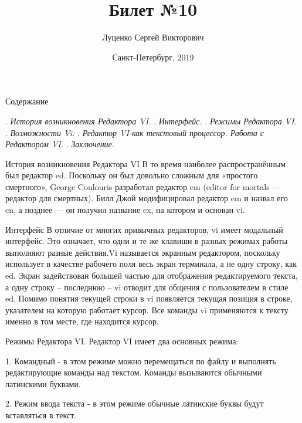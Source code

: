 \documentclass{beamer}
\begin{document}
\title{Билет №10} 
\author{Луценко Сергей Викторович}
\date{Санкт-Петербург, 2019} 
\frame{\titlepage} 
\begin{frame}{Содержание}
\begin{thebibliography}{10}
\beamertemplatebookbibitems

{}. {\em История возникновения Редактора VI.}
{}. {\em Интерфейс.}
{}. {\em Режимы Редактора VI.}
{}. {\em Возможности Vi:}
{}. {\em Редактор VI-как текстовый процессор. Работа с Редактором VI.}
{}. {\em Заключение.}
\end{thebibliography}
\end{frame}

\begin{frame}{История возникновения Редактора VI}
В то время наиболее распространённым был редактор ed. Поскольку он был довольно сложным для «простого смертного», George Coulouris разработал редактор em (editor for mortals — редактор для смертных). Билл Джой модифицировал редактор em и назвал его en, а позднее — он получил название ex, на котором и основан vi.
\end{frame}

\begin{frame}{Интерфейс}
В отличие от многих привычных редакторов, vi имеет модальный интерфейс. Это означает, что одни и те же клавиши в разных режимах работы выполняют разные действия.Vi называется экранным редактором, поскольку использует в качестве рабочего поля весь экран терминала, а не одну строку, как ed. Экран задействован большей частью для отображения редактируемого текста, а одну строку – последнюю – vi отводит для общения с пользователем в стиле ed. Помимо понятия текущей строки в vi появляется текущая позиция в строке, указателем на которую работает курсор. Все команды vi применяются к тексту именно в том месте, где находится курсор.


\end{frame}

\begin{frame}{Режимы Редактора VI.}
Редактор VI имеет два основных режима: 
\newline



1.  Командный  -  в  этом  режиме можно перемещаться по файлу и
выполнять редактирующие команды над текстом. Команды вызываются
обычными латинскими буквами.

2. Режим ввода текста - в этом режиме обычные латинские  буквы  будут вставляться в текст.



\end{frame}
\end{document}
